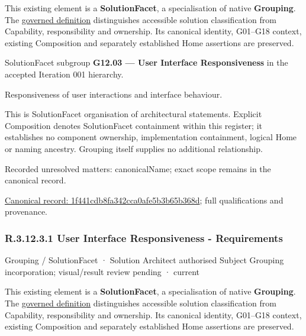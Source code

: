 This existing element is a \textbf{SolutionFacet}, a specialisation of native
\textbf{Grouping}. The \href{\detokenize{../../../../../../../governance/continuum-representation.md#solutionfacet-classification--1119-candidate}}{governed definition}
distinguishes accessible solution classification from Capability, responsibility
and ownership. Its canonical identity, G01–G18 context, existing Composition
and separately established Home assertions are preserved.



SolutionFacet subgroup \textbf{G12.03 — User Interface Responsiveness} in the accepted Iteration 001 hierarchy.



Responsiveness of user interactions and interface behaviour.



This is SolutionFacet organisation of architectural statements. Explicit Composition denotes SolutionFacet containment within this register; it establishes no component ownership, implementation containment, logical Home or naming ancestry. Grouping itself supplies no additional relationship.


{\small Recorded unresolved matters: canonicalName; exact scope remains in the canonical record.}\par
{\footnotesize \href{../../../../../../../continuum/grouping/1f441cdb8fa342cca0afe5b3b65b368d.md}{Canonical record: 1f441cdb8fa342cca0afe5b3b65b368d}; full qualifications and provenance.}\par
\subsubsection*{R.3.12.3.1 User Interface Responsiveness - Requirements}
\label{navigation:R.3.12.3.1}

\label{element:4643d0b24fe7420b8e3fd0f4a2f4b1de}
{\small Grouping / SolutionFacet · Solution Architect authorised Subject Grouping incorporation; visual/result review pending · current}\par

This existing element is a \textbf{SolutionFacet}, a specialisation of native
\textbf{Grouping}. The \href{\detokenize{../../../../../../../governance/continuum-representation.md#solutionfacet-classification--1119-candidate}}{governed definition}
distinguishes accessible solution classification from Capability, responsibility
and ownership. Its canonical identity, G01–G18 context, existing Composition
and separately established Home assertions are preserved.



